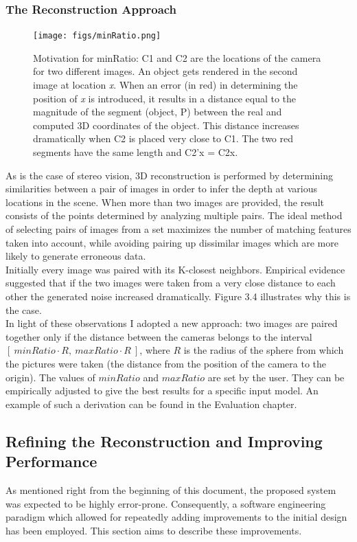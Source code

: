 \documentclass[12pt,a4paper,twoside,openright]{report}
\begin{document}
\subsubsection{The Reconstruction Approach}
\begin{figure}
\begin{center}
\texttt{[image: figs/minRatio.png]} 
\caption{Motivation for minRatio: C1 and C2 are the locations of the camera for two different images. An object gets rendered in the second image at location \emph{x}. When an error (in red) in determining the position of \emph{x} is introduced, it results in a distance equal to the magnitude of the segment (object, P) between the real and computed 3D coordinates of the object. This distance increases dramatically when C2 is placed very close to C1. The two red segments have the same length and C2'x = C2x.}
\end{center}
\end{figure}
As is the case of stereo vision, 3D reconstruction is performed by determining similarities between a pair of images in order to infer the depth at various locations in the scene. When more than two images are provided, the result consists of the points determined by analyzing multiple pairs. The ideal method of selecting pairs of images from a set maximizes the number of matching features taken into account, while avoiding pairing up dissimilar images which are more likely to generate erroneous data.\\
\linebreak
Initially every image was paired with its K-closest neighbors. Empirical evidence suggested that if the two images were taken from a very close distance to each other the generated noise increased dramatically. Figure 3.4 illustrates why this is the case. \\
In light of these observations I adopted a new approach: two images are paired together only if the distance between the cameras belongs to the interval $[\ minRatio \cdot R,\ maxRatio \cdot R\ ]$, where $R$ is the radius of the sphere from which the pictures were taken (the distance from the position of the camera to the origin). The values of $minRatio$ and $maxRatio$ are set by the user. They can be empirically adjusted to give the best results for a specific input model. An example of such a derivation can be found in the Evaluation chapter.\\

\subsection{Refining the Reconstruction and Improving Performance}
As mentioned right from the beginning of this document, the proposed system was expected to be highly error-prone. Consequently, a software engineering paradigm which allowed for repeatedly adding improvements to the initial design has been employed. This section aims to describe these improvements.
\end{document}
